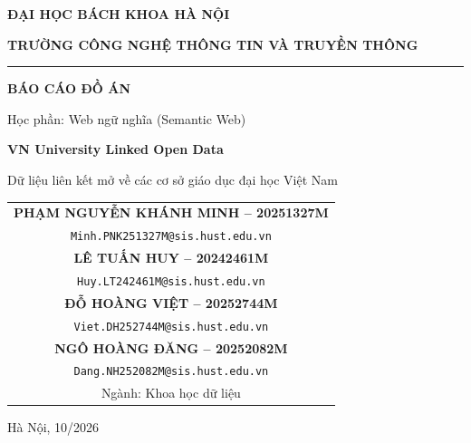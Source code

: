 \documentclass[12pt,a4paper]{article}
\begin{document}
\begin{titlepage}
\thispagestyle{empty}
\centering
{\large\bfseries ĐẠI HỌC BÁCH KHOA HÀ NỘI\par}
{\large\bfseries TRƯỜNG CÔNG NGHỆ THÔNG TIN VÀ TRUYỀN THÔNG\par}
\vspace{0.3cm}\rule{0.6\textwidth}{0.6pt}\par
\vspace{2.6cm}
{\LARGE\bfseries BÁO CÁO ĐỒ ÁN\par}
\vspace{0.4cm}
{\large Học phần: Web ngữ nghĩa (Semantic Web)\par}
\vspace{1.6cm}
{\huge\bfseries VN University Linked Open Data\par}
\vspace{0.4cm}
{\large Dữ liệu liên kết mở về các cơ sở giáo dục đại học Việt Nam\par}
\vspace{2.4cm}
{\large
\begin{tabular}{c}
\textbf{PHẠM NGUYỄN KHÁNH MINH -- 20251327M}\\
{\normalsize\texttt{Minh.PNK251327M@sis.hust.edu.vn}}\\[8pt]
\textbf{LÊ TUẤN HUY -- 20242461M}\\
{\normalsize\texttt{Huy.LT242461M@sis.hust.edu.vn}}\\[8pt]
\textbf{ĐỖ HOÀNG VIỆT -- 20252744M}\\
{\normalsize\texttt{Viet.DH252744M@sis.hust.edu.vn}}\\[8pt]
\textbf{NGÔ HOÀNG ĐĂNG -- 20252082M}\\
{\normalsize\texttt{Dang.NH252082M@sis.hust.edu.vn}}\\[14pt]
Ngành: Khoa học dữ liệu
\end{tabular}\par}
\vfill
{\large Hà Nội, 10/2026\par}
\end{titlepage}
\end{document}
